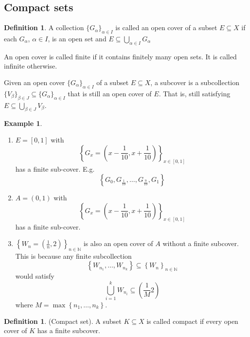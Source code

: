 \documentclass[10pt]{article}
\theoremstyle{definition}
\newtheorem{definition}[theorem]{Definition}
\newtheorem{example}[theorem]{Example}
\theoremstyle{remark}
\begin{document}
\subsection{Compact sets}

\begin{definition}
    A collection $\{G_\alpha\}_{\alpha \in I}$ is called an open cover of a subset $E\subseteq X$ if each $G_\alpha$, $\alpha \in I$, is an open set and $E \subseteq \bigcup_{\alpha \in I} G_\alpha$

    An open cover is called finite if it contains finitely many open sets.
    It is called infinite otherwise.

    Given an open cover $\{G_\alpha\}_{\alpha \in I}$ of a subset $E\subseteq X$, a subcover is a subcollection 
    $\{V_\beta\}_{\beta \in J} \subseteq \{G_\alpha\}_{\alpha \in I}$ that is still an open cover of $E$.
    That is, still satisfying $E \subseteq \bigcup_{\beta \in J} V_\beta$.
\end{definition}
\begin{example}
    \hfill
    \begin{enumerate}
        \item $E = [0, 1]$ with
            $$\left\{G_x = \left(x - \frac{1}{10}, x + \frac{1}{10}\right)\right\}_{x \in [0, 1]}$$ has a finite sub-cover. E.g.
            $$\left\{G_0, G_{\frac{1}{10}}, \ldots, G_{\frac{9}{10}}, G_1\right\}$$
        \item $A = (0, 1)$ with
            $$\left\{G_x = \left(x - \frac{1}{10}, x + \frac{1}{10}\right)\right\}_{x \in [0, 1]}$$ has a finite sub-cover.
        \item $\left\{W_n = \left(\frac{1}{n}, 2\right)\right\}_{n \in \mathbb{N}}$ is also an open cover of $A$ without a finite subcover. This is because any finite subcollection
            $$\left\{W_{n_1}, \ldots, W_{n_k}\right\} \subseteq \left\{W_n\right\}_{n \in \mathbb{N}}$$
            would satisfy
            $$\bigcup_{i=1}^k W_{n_i} \subseteq \left(\frac{1}{M} 2\right)$$
            where $M = \max\left\{n_1, \ldots, n_k\right\}$.
    \end{enumerate}
\end{example}
\begin{definition}
    (Compact set).
    A subset $K \subseteq X$ is called compact if every open cover of $K$ has a finite subcover.
\end{definition}
\end{document}

